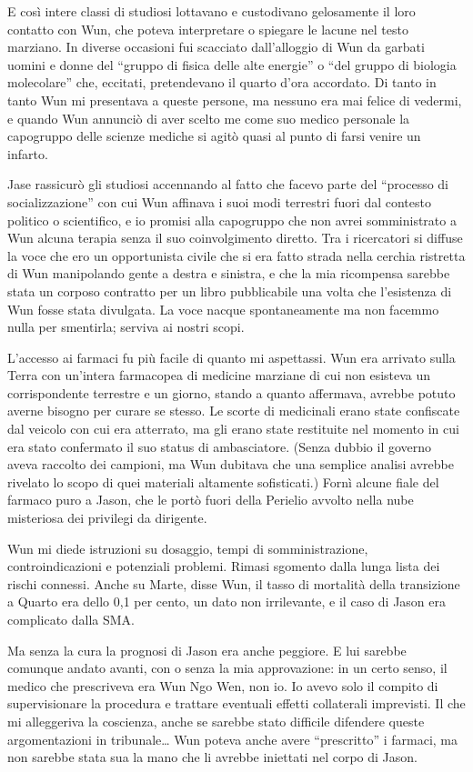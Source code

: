 E così intere classi di studiosi lottavano e custodivano gelosamente il
loro contatto con Wun, che poteva interpretare o spiegare le lacune nel
testo marziano. In diverse occasioni fui scacciato dall'alloggio di Wun
da garbati uomini e donne del ``gruppo di fisica delle alte energie'' o
``del gruppo di biologia molecolare'' che, eccitati, pretendevano il
quarto d'ora accordato. Di tanto in tanto Wun mi presentava a queste
persone, ma nessuno era mai felice di vedermi, e quando Wun annunciò di
aver scelto me come suo medico personale la capogruppo delle scienze
mediche si agitò quasi al punto di farsi venire un infarto.

Jase rassicurò gli studiosi accennando al fatto che facevo parte del
``processo di socializzazione'' con cui Wun affinava i suoi modi
terrestri fuori dal contesto politico o scientifico, e io promisi alla
capogruppo che non avrei somministrato a Wun alcuna terapia senza il suo
coinvolgimento diretto. Tra i ricercatori si diffuse la voce che ero un
opportunista civile che si era fatto strada nella cerchia ristretta di
Wun manipolando gente a destra e sinistra, e che la mia ricompensa
sarebbe stata un corposo contratto per un libro pubblicabile una volta
che l'esistenza di Wun fosse stata divulgata. La voce nacque
spontaneamente ma non facemmo nulla per smentirla; serviva ai nostri
scopi.

L'accesso ai farmaci fu più facile di quanto mi aspettassi. Wun era
arrivato sulla Terra con un'intera farmacopea di medicine marziane di
cui non esisteva un corrispondente terrestre e un giorno, stando a
quanto affermava, avrebbe potuto averne bisogno per curare se stesso. Le
scorte di medicinali erano state confiscate dal veicolo con cui era
atterrato, ma gli erano state restituite nel momento in cui era stato
confermato il suo status di ambasciatore. (Senza dubbio il governo aveva
raccolto dei campioni, ma Wun dubitava che una semplice analisi avrebbe
rivelato lo scopo di quei materiali altamente sofisticati.) Fornì alcune
fiale del farmaco puro a Jason, che le portò fuori della Perielio
avvolto nella nube misteriosa dei privilegi da dirigente.

Wun mi diede istruzioni su dosaggio, tempi di somministrazione,
controindicazioni e potenziali problemi. Rimasi sgomento dalla lunga
lista dei rischi connessi. Anche su Marte, disse Wun, il tasso di
mortalità della transizione a Quarto era dello 0,1 per cento, un dato
non irrilevante, e il caso di Jason era complicato dalla SMA.

Ma senza la cura la prognosi di Jason era anche peggiore. E lui sarebbe
comunque andato avanti, con o senza la mia approvazione: in un certo
senso, il medico che prescriveva era Wun Ngo Wen, non io. Io avevo solo
il compito di supervisionare la procedura e trattare eventuali effetti
collaterali imprevisti. Il che mi alleggeriva la coscienza, anche se
sarebbe stato difficile difendere queste argomentazioni in
tribunale\ldots{} Wun poteva anche avere ``prescritto'' i farmaci, ma
non sarebbe stata sua la mano che li avrebbe iniettati nel corpo di
Jason.

